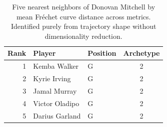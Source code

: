 \begin{table}[htbp]
  \centering\small
  \begin{tabular}{rllc}
    \toprule
    Rank & Player & Position & Archetype \\
    \midrule
    1 & Kemba Walker & G & 2 \\
    2 & Kyrie Irving & G & 2 \\
    3 & Jamal Murray & G & 2 \\
    4 & Victor Oladipo & G & 2 \\
    5 & Darius Garland & G & 2 \\
    \bottomrule
  \end{tabular}
  \caption{Five nearest neighbors of Donovan Mitchell by mean Fr\'{e}chet curve distance across metrics. Identified purely from trajectory shape without dimensionality reduction.}
  \label{tab:Donovan_Mitchell_frechet_curve_neighbors}
\end{table}


